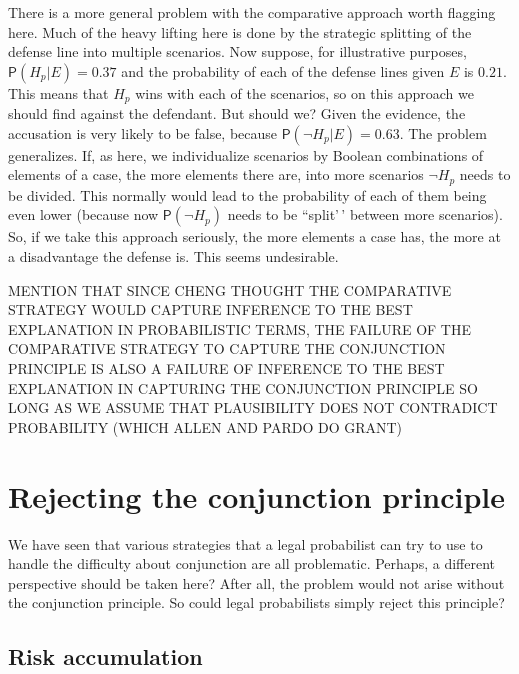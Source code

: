 \documentclass[
  10pt,
  dvipsnames,enabledeprecatedfontcommands]{scrartcl}
\newcommand{\n}{\neg}
\newcommand{\pr}[1]{\mathsf{P}(#1)}
\begin{document}
There is a more general problem with the comparative approach worth
flagging here. Much of the heavy lifting here is done by the strategic
splitting of the defense line into multiple scenarios. Now suppose, for
illustrative purposes, \(\pr{H_p\vert E}=0.37\) and the probability of
each of the defense lines given \(E\) is \(0.21\). This means that
\(H_p\) wins with each of the scenarios, so on this approach we should
find against the defendant. But should we? Given the evidence, the
accusation is very likely to be false, because
\(\pr{\n H_p \vert E}=0.63\). The problem generalizes. If, as here, we
individualize scenarios by Boolean combinations of elements of a case,
the more elements there are, into more scenarios \(\n H_p\) needs to be
divided. This normally would lead to the probability of each of them
being even lower (because now \(\pr{\n H_p}\) needs to be ``split'\,'
between more scenarios). So, if we take this approach seriously, the
more elements a case has, the more at a disadvantage the defense is.
This seems undesirable.

MENTION THAT SINCE CHENG THOUGHT THE COMPARATIVE STRATEGY WOULD CAPTURE
INFERENCE TO THE BEST EXPLANATION IN PROBABILISTIC TERMS, THE FAILURE OF
THE COMPARATIVE STRATEGY TO CAPTURE THE CONJUNCTION PRINCIPLE IS ALSO A
FAILURE OF INFERENCE TO THE BEST EXPLANATION IN CAPTURING THE
CONJUNCTION PRINCIPLE SO LONG AS WE ASSUME THAT PLAUSIBILITY DOES NOT
CONTRADICT PROBABILITY (WHICH ALLEN AND PARDO DO GRANT)

\hypertarget{rejecting-the-conjunction-principle}{%
\section{Rejecting the conjunction
principle}\label{rejecting-the-conjunction-principle}}

We have seen that various strategies that a legal probabilist can try to
use to handle the difficulty about conjunction are all problematic.
Perhaps, a different perspective should be taken here? After all, the
problem would not arise without the conjunction principle. So could
legal probabilists simply reject this principle?

\hypertarget{risk-accumulation}{%
\subsection{Risk accumulation}\label{risk-accumulation}}
\end{document}
